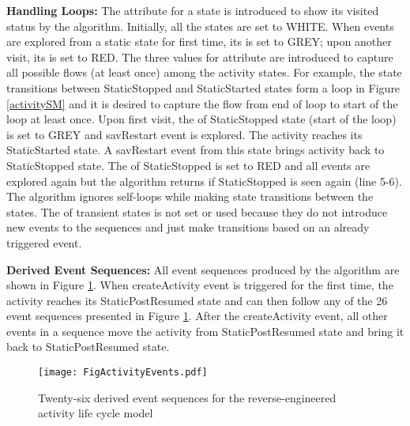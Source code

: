 \documentclass[10pt]{elsarticle}
\begin{document}
{\noindent \bf{Handling Loops:}} The  attribute for a state is introduced to show its visited status by the algorithm. Initially, all the states are set to WHITE. When events are explored from a static state for first time, its  is set to GREY; upon another visit, its  is set to RED. The three values for  attribute are introduced to capture all possible flows (at least once) among the activity states. For example, the state transitions between StaticStopped and StaticStarted states form a loop in Figure \ref{activitySM} and it is desired to capture the flow from end of loop to start of the loop at least once. Upon first visit, the  of StaticStopped state (start of the loop) is set to GREY and savRestart event is explored. The activity reaches its StaticStarted state. A savRestart event from this state brings activity back to StaticStopped state. The  of StaticStopped is set to RED and all events are explored again but the algorithm returns if StaticStopped is seen again (line 5-6). The algorithm ignores self-loops while making state transitions between the states. The  of transient states is not set or used because they do not introduce new events to the sequences and just make transitions based on an already triggered event. 

{\noindent \bf{Derived Event Sequences:}}  All event sequences produced by the algorithm are shown in Figure \ref{activityEvents}. When createActivity event is triggered for the first time, the activity reaches its StaticPostResumed state and can then follow any of the 26 event sequences presented in Figure \ref{activityEvents}. After the createActivity event, all other events in a sequence move the activity from StaticPostResumed state and bring it back to StaticPostResumed state. 


\begin{figure}[ht]
\centering
\texttt{[image: FigActivityEvents.pdf]}
\caption{Twenty-six derived event sequences for the reverse-engineered activity life cycle model}
\label{activityEvents}
\end{figure}


\tikzset{>=latex}

\end{document}
